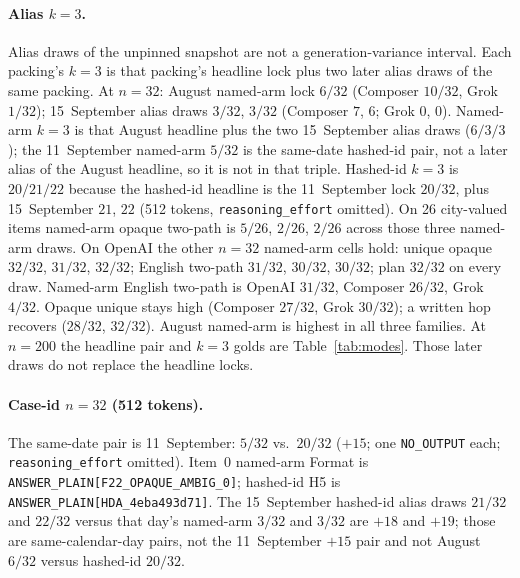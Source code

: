 \documentclass[10pt]{article} %
\begin{document}
\paragraph{Alias $k{=}3$.}
Alias draws of the unpinned snapshot are not a generation-variance
interval.
Each packing's $k{=}3$ is that packing's headline lock plus two later
alias draws of the same packing.
At $n{=}32$: August named-arm lock $6/32$ (Composer $10/32$, Grok $1/32$);
15~September alias draws $3/32$, $3/32$
(Composer $7$, $6$; Grok $0$, $0$).
Named-arm $k{=}3$ is that August headline plus the two 15~September alias draws
($6/3/3$); the 11~September named-arm $5/32$ is the same-date hashed-id
pair, not a later alias of the August headline, so it is not in that triple.
Hashed-id $k{=}3$ is $20/21/22$ because the hashed-id headline is the
11~September lock $20/32$, plus 15~September $21$, $22$
(512 tokens, \texttt{reasoning\_effort} omitted).
On 26 city-valued items named-arm opaque two-path is $5/26$, $2/26$,
$2/26$ across those three named-arm draws.
On OpenAI the other $n{=}32$ named-arm cells hold: unique opaque $32/32$,
$31/32$, $32/32$; English two-path $31/32$, $30/32$, $30/32$; plan
$32/32$ on every draw.
Named-arm English two-path is OpenAI $31/32$, Composer $26/32$, Grok
$4/32$.
Opaque unique stays high (Composer $27/32$, Grok $30/32$); a written hop
recovers ($28/32$, $32/32$).
August named-arm is highest in all three families.
At $n{=}200$ the headline pair and $k{=}3$ golds are Table~\ref{tab:modes}.
Those later draws do not replace the headline locks.

\paragraph{Case-id $n{=}32$ (512 tokens).}
The same-date pair is 11~September: $5/32$ vs.\ $20/32$ (${+}15$; one
\texttt{NO\_OUTPUT} each; \texttt{reasoning\_effort} omitted).
Item~0 named-arm Format is
\texttt{ANSWER\_PLAIN[F22\_OPAQUE\_AMBIG\_0]}; hashed-id H5 is
\texttt{ANSWER\_PLAIN[HDA\_4eba493d71]}.
The 15~September hashed-id alias draws $21/32$ and $22/32$ versus that
day's named-arm $3/32$ and $3/32$ are ${+}18$ and ${+}19$; those are
same-calendar-day pairs, not the 11~September ${+}15$ pair and not
August $6/32$ versus hashed-id $20/32$.
\end{document}
